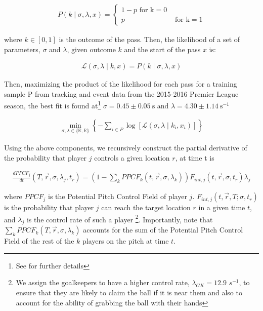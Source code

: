 \documentclass[
  10pt,
  twoside,nohyper]{book}
\begin{document}
\begin{align}
P(k \mid \sigma, \lambda, x)=\left\{\begin{array}{lr}
1-p \text { for } \mathrm{k}=0 \\
p & \text { for } \mathrm{k}=1
\end{array}\right.
\end{align}

where \(k \in [0,1]\) is the outcome of the pass. Then, the likelihood of a set of\\
parameters, \(\sigma\) and \(\lambda\), given outcome \(k\) and the start of the pass \(x\) is:

\begin{align}
\mathcal{L}(\sigma, \lambda \mid k, x)=P(k \mid \sigma, \lambda, x)
\end{align}

Then, maximizing the product of the likelihood for each pass for a training sample P from tracking and event data from the 2015-2016 Premier League season, the best fit is found at\footnote{See \citep{SpearmanFit} for further details} \(\sigma=0.45 \pm 0.05 \mathrm{~s} \text { and } \lambda=4.30 \pm 1.14 \mathrm{~s}^{-1}\)

\begin{align}
\min _{\sigma, \lambda \in\{\mathbb{R}, \mathbb{R}\}}\left\{-\sum_{i \in P} \log \left[\mathcal{L}\left(\sigma, \lambda \mid k_i, x_i\right)\right]\right\}
\end{align}

Using the above components, we recursively construct the partial derivative of the probability that player \(j\) controls a given location \(r\), at time t is

\begin{align}
\frac{d P P C F_j}{d t}\left(T, \vec{r} , \sigma, \lambda_j, t_r\right)=\left(1-\sum_k P P C F_k\left(t, \vec{r} , \sigma, \lambda_k\right)\right) F_{int,j}(t, \vec{r}  , \sigma, t_r) \lambda_j
\label{eq:PC}
\end{align}

where \(PPCF_j\) is the Potential Pitch Control Field of player \(j\). \(F_{int,j}(t, \vec{r}, T ; \sigma, t_r)\) is the probability that player \(j\) can reach the target location \(r\) in a given time \(t\), and \(\lambda_j\) is the control rate of such a player \footnote{We assign the goalkeepers to have a higher control rate, \(\lambda_{GK} = 12.9\) \(s^{-1}\), to ensure that they are likely to claim the ball if it is near them and also to account for the ability of grabbing the ball with their hands}. Importantly, note that \(\sum_k P P C F_k\left(T, \vec{r} , \sigma, \lambda_k\right)\) accounts for the sum of the Potential Pitch Control Field of the rest of the \(k\) players on the pitch at time \(t\).
\end{document}
